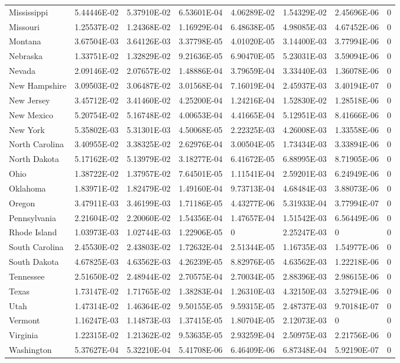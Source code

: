 \begin{longtable}[c]{p{0.75in}p{0.75in}p{0.75in}p{0.75in}p{0.75in}p{0.75in}p{0.75in}p{0.75in}}
Mississippi & 5.44446E-02 & 5.37910E-02 & 6.53601E-04 & 4.06289E-02 & 1.54329E-02 & 2.45696E-06 & 0 \tabularnewline
Missouri & 1.25537E-02 & 1.24368E-02 & 1.16929E-04 & 6.48638E-05 & 4.98085E-03 & 4.67452E-06 & 0 \tabularnewline
Montana & 3.67504E-03 & 3.64126E-03 & 3.37798E-05 & 4.01020E-05 & 3.14400E-03 & 3.77994E-06 & 0 \tabularnewline
Nebraska & 1.33751E-02 & 1.32829E-02 & 9.21636E-05 & 6.90470E-05 & 5.23031E-03 & 3.59094E-06 & 0 \tabularnewline
Nevada & 2.09146E-02 & 2.07657E-02 & 1.48886E-04 & 3.79659E-04 & 3.33440E-03 & 1.36078E-06 & 0 \tabularnewline
New Hampshire & 3.09503E-02 & 3.06487E-02 & 3.01568E-04 & 7.16019E-04 & 2.45937E-03 & 3.40194E-07 & 0 \tabularnewline
New Jersey & 3.45712E-02 & 3.41460E-02 & 4.25200E-04 & 1.24216E-04 & 1.52830E-02 & 1.28518E-06 & 0 \tabularnewline
New Mexico & 5.20754E-02 & 5.16748E-02 & 4.00653E-04 & 4.41665E-04 & 5.12951E-03 & 8.41666E-06 & 0 \tabularnewline
New York & 5.35802E-03 & 5.31301E-03 & 4.50068E-05 & 2.22325E-03 & 4.26008E-03 & 1.33558E-06 & 0 \tabularnewline
North Carolina & 3.40955E-02 & 3.38325E-02 & 2.62976E-04 & 3.00504E-05 & 1.73434E-03 & 3.33894E-06 & 0 \tabularnewline
North Dakota & 5.17162E-02 & 5.13979E-02 & 3.18277E-04 & 6.41672E-05 & 6.88995E-03 & 8.71905E-06 & 0 \tabularnewline
Ohio & 1.38722E-02 & 1.37957E-02 & 7.64501E-05 & 1.11541E-04 & 2.59201E-03 & 6.24949E-06 & 0 \tabularnewline
Oklahoma & 1.83971E-02 & 1.82479E-02 & 1.49160E-04 & 9.73713E-04 & 4.68484E-03 & 3.88073E-06 & 0 \tabularnewline
Oregon & 3.47911E-03 & 3.46199E-03 & 1.71186E-05 & 4.43277E-06 & 5.31933E-04 & 3.77994E-07 & 0 \tabularnewline
Pennsylvania & 2.21604E-02 & 2.20060E-02 & 1.54356E-04 & 1.47657E-04 & 1.51542E-03 & 6.56449E-06 & 0 \tabularnewline
Rhode Island & 1.03973E-03 & 1.02744E-03 & 1.22906E-05 & 0 & 2.25247E-03 & 0 & 0 \tabularnewline
South Carolina & 2.45530E-02 & 2.43803E-02 & 1.72632E-04 & 2.51344E-05 & 1.16735E-03 & 1.54977E-06 & 0 \tabularnewline
South Dakota & 4.67825E-03 & 4.63562E-03 & 4.26239E-05 & 8.82976E-05 & 4.63562E-03 & 1.22218E-06 & 0 \tabularnewline
Tennessee & 2.51650E-02 & 2.48944E-02 & 2.70575E-04 & 2.70034E-05 & 2.88396E-03 & 2.98615E-06 & 0 \tabularnewline
Texas & 1.73147E-02 & 1.71765E-02 & 1.38283E-04 & 1.26310E-03 & 4.32150E-03 & 3.52794E-06 & 0 \tabularnewline
Utah & 1.47314E-02 & 1.46364E-02 & 9.50155E-05 & 9.59315E-05 & 2.48737E-03 & 9.70184E-07 & 0 \tabularnewline
Vermont & 1.16247E-03 & 1.14873E-03 & 1.37415E-05 & 1.80704E-05 & 2.12073E-03 & 0 & 0 \tabularnewline
Virginia & 1.22315E-02 & 1.21362E-02 & 9.53635E-05 & 2.93259E-04 & 2.50975E-03 & 2.21756E-06 & 0 \tabularnewline
Washington & 5.37627E-04 & 5.32210E-04 & 5.41708E-06 & 6.46409E-06 & 6.87348E-04 & 5.92190E-07 & 0 \tabularnewline

\end{longtable}
